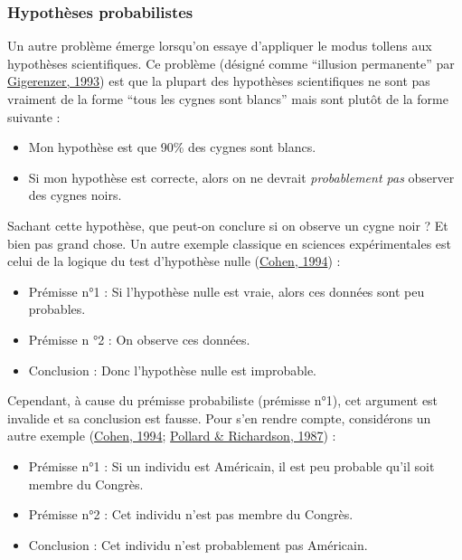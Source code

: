\documentclass[
  a4paper,11pt,twoside,onecolumn,openright,final,oldfontcommands]{memoir}
\theoremstyle{definition}
\theoremstyle{definition}
\theoremstyle{definition}
\theoremstyle{definition}
\theoremstyle{remark}
\begin{document}
\hypertarget{hypothuxe8ses-probabilistes}{%
\subsubsection{Hypothèses probabilistes}\label{hypothuxe8ses-probabilistes}}

Un autre problème émerge lorsqu'on essaye d'appliquer le modus tollens aux hypothèses scientifiques. Ce problème (désigné comme ``illusion permanente'' par \protect\hyperlink{ref-gigerenzer_superego_1993}{Gigerenzer, 1993}) est que la plupart des hypothèses scientifiques ne sont pas vraiment de la forme ``tous les cygnes sont blancs'' mais sont plutôt de la forme suivante :

\begin{itemize}
\item
  Mon hypothèse est que 90\% des cygnes sont blancs.
\item
  Si mon hypothèse est correcte, alors on ne devrait \emph{probablement pas} observer des cygnes noirs.
\end{itemize}

Sachant cette hypothèse, que peut-on conclure si on observe un cygne noir ? Et bien pas grand chose. Un autre exemple classique en sciences expérimentales est celui de la logique du test d'hypothèse nulle (\protect\hyperlink{ref-cohen_earth_1994}{Cohen, 1994}) :

\begin{itemize}
\item
  Prémisse n°1 : Si l'hypothèse nulle est vraie, alors ces données sont peu probables.
\item
  Prémisse n °2 : On observe ces données.
\item
  Conclusion : Donc l'hypothèse nulle est improbable.
\end{itemize}

Cependant, à cause du prémisse probabiliste (prémisse n°1), cet argument est invalide et sa conclusion est fausse. Pour s'en rendre compte, considérons un autre exemple (\protect\hyperlink{ref-cohen_earth_1994}{Cohen, 1994}; \protect\hyperlink{ref-pollard_probability_1987}{Pollard \& Richardson, 1987}) :

\begin{itemize}
\item
  Prémisse n°1 : Si un individu est Américain, il est peu probable qu'il soit membre du Congrès.
\item
  Prémisse n°2 : Cet individu n'est pas membre du Congrès.
\item
  Conclusion : Cet individu n'est probablement pas Américain.
\end{itemize}
\end{document}
